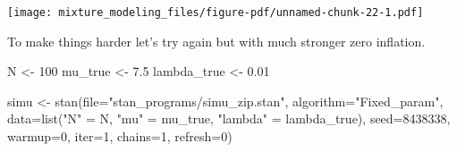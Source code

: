 \documentclass[
  letterpaper,
  DIV=11,
  numbers=noendperiod]{scrartcl}
\newenvironment{Shaded}{\begin{snugshade}}{\end{snugshade}}
\newcommand{\AttributeTok}[1]{\textcolor[rgb]{0.40,0.45,0.13}{#1}}
\newcommand{\DecValTok}[1]{\textcolor[rgb]{0.68,0.00,0.00}{#1}}
\newcommand{\FloatTok}[1]{\textcolor[rgb]{0.68,0.00,0.00}{#1}}
\newcommand{\FunctionTok}[1]{\textcolor[rgb]{0.28,0.35,0.67}{#1}}
\newcommand{\NormalTok}[1]{\textcolor[rgb]{0.00,0.23,0.31}{#1}}
\newcommand{\OtherTok}[1]{\textcolor[rgb]{0.00,0.23,0.31}{#1}}
\newcommand{\SpecialCharTok}[1]{\textcolor[rgb]{0.37,0.37,0.37}{#1}}
\newcommand{\StringTok}[1]{\textcolor[rgb]{0.13,0.47,0.30}{#1}}
\begin{document}
\begin{Shaded}
\end{Shaded}

\texttt{[image: mixture\_modeling\_files/figure-pdf/unnamed-chunk-22-1.pdf]}

To make things harder let's try again but with much stronger zero
inflation.

\begin{Shaded}
\begin{Highlighting}[]
\NormalTok{N }\OtherTok{\textless{}{-}} \DecValTok{100}
\NormalTok{mu\_true }\OtherTok{\textless{}{-}} \FloatTok{7.5}
\NormalTok{lambda\_true }\OtherTok{\textless{}{-}} \FloatTok{0.01}

\NormalTok{simu }\OtherTok{\textless{}{-}} \FunctionTok{stan}\NormalTok{(}\AttributeTok{file=}\StringTok{"stan\_programs/simu\_zip.stan"}\NormalTok{,}
             \AttributeTok{algorithm=}\StringTok{"Fixed\_param"}\NormalTok{,}
             \AttributeTok{data=}\FunctionTok{list}\NormalTok{(}\StringTok{"N"} \OtherTok{=}\NormalTok{ N,}
                       \StringTok{"mu"} \OtherTok{=}\NormalTok{ mu\_true,}
                       \StringTok{"lambda"} \OtherTok{=}\NormalTok{ lambda\_true),}
             \AttributeTok{seed=}\DecValTok{8438338}\NormalTok{,}
             \AttributeTok{warmup=}\DecValTok{0}\NormalTok{, }\AttributeTok{iter=}\DecValTok{1}\NormalTok{, }\AttributeTok{chains=}\DecValTok{1}\NormalTok{, }\AttributeTok{refresh=}\DecValTok{0}\NormalTok{)}
\end{Highlighting}
\end{Shaded}
\end{document}
